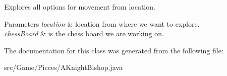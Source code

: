 Explores all options for movement from location.


\begin{DoxyParams}{Parameters}
{\em location} & location from where we want to explore. \\
\hline
{\em chess\+Board} & is the chess board we are working on. \\
\hline
\end{DoxyParams}


The documentation for this class was generated from the following file\+:\begin{DoxyCompactItemize}
\item 
src/\+Game/\+Pieces/A\+Knight\+Bishop.\+java\end{DoxyCompactItemize}
